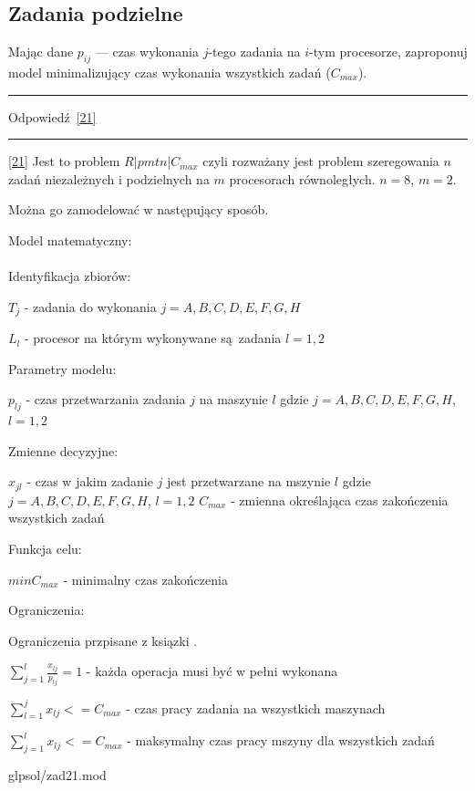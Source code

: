 \documentclass{article}
\begin{document}
\subsection{Zadania podzielne \label{21}}
Mając dane \(p_{ij}\) — czas wykonania \(j\)-tego zadania na \(i\)-tym procesorze,
zaproponuj model minimalizujący czas wykonania wszystkich zadań (\(C_{max}\)).

\par\noindent\rule{\textwidth}{0.4pt}
Odpowiedź \ref{21}
\par\noindent\rule{\textwidth}{0.4pt}

\ref{21} Jest to problem $R|pmtn|C_{max}$ czyli rozważany jest problem szeregowania $n$ zadań niezależnych i podzielnych na $m$ procesorach równoległych. $n = 8$, $m = 2$.

Można go zamodelować w następujący sposób.

\noindent Model matematyczny: \\\\

\noindent Identyfikacja zbiorów:

$T_j$ - zadania do wykonania $j = {A,B,C,D,E,F,G,H}$

$L_{l}$ - procesor na którym wykonywane są zadania $l = {1,2}$

\noindent Parametry modelu:

$p_{lj}$ - czas przetwarzania zadania $j$ na maszynie $l$ gdzie $j = {A,B,C,D,E,F,G,H}$, $l = {1,2}$

\noindent Zmienne decyzyjne:

$x_{jl}$ - czas w jakim zadanie $j$ jest przetwarzane na mszynie $l$ gdzie $j = {A,B,C,D,E,F,G,H}$, $l = {1,2}$ 
$C_{max}$ - zmienna określająca czas zakończenia wszystkich zadań

\noindent Funkcja celu:

$min C_{max}$ - minimalny czas zakończenia

\noindent Ograniczenia:

Ograniczenia przpisane z ksiązki \cite{scheduling}.

$\sum^{l}_{j = 1} \frac{x_{lj}}{p_{lj}} = 1$ - każda operacja musi być w pełni wykonana

$\sum^{j}_{l = 1} x_{lj} <= C_{max}$  - czas pracy zadania na wszystkich maszynach

$\sum^{l}_{j = 1} x_{lj} <= C_{max}$  - maksymalny czas pracy mszyny dla wszystkich zadań


{glpsol/zad21.mod}
\end{document}
